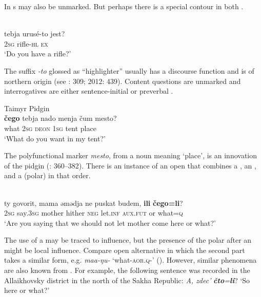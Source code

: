 In \textit{} s may also be unmarked. But perhaps there is a special  contour in both .

\ea%
    \label{ex:indo:25}
    \\
    \gll tebja  urusé-to  jest?\\
    2\textsc{sg}  rifle-\textsc{hl}  \textsc{ex}\\
    \glt ‘Do you have a rifle?’ \citep[312]{Stern2005}
    \z

\noindent The suffix \textit{-to} glossed as “highlighter” usually has a discourse function and is of northern  origin (see \citealt{Stern2005}: 309; 2012: 439). Content questions are unmarked and interrogatives are either sentence-initial or preverbal \citep[508]{Stern2012}.

\ea%
    \label{ex:indo:26}
    Taimyr Pidgin\\
    \gll \textbf{{čego}} tebja  nado  menja  čum  mesto?\\
    what  2\textsc{sg}  \textsc{deon}  1\textsc{sg}  tent  place\\
    \glt ‘What do you want in my tent?’ \citep[361]{Stern2012}
    \z

\noindent The polyfunctional  marker \textit{mesto}, from a noun meaning ‘place’, is an innovation of the pidgin (\citealt{Stern2012}: 360–382). There is an instance of an open  that combines a , an , and a (polar)  in that order.

\newpage 
\ea%
    \label{ex:indo:27}
    \\
    \gll ty  govorit,  mama  əmədja    ne  puskat  budem, \textbf{ili}  \textbf{čego=li}?\\
    2\textsc{sg}  say.3\textsc{sg} mother  hither    \textsc{neg}  let.\textsc{inf}  \textsc{aux.fut} or  what=\textsc{q}\\
    \glt ‘Are you saying that we should not let mother come here or what?’ \citep[310]{Stern2005}
    \z

\noindent The use of a  may be traced to  influence, but the presence of the  polar  after an  might be local influence. Compare  open alternative  in which the second part takes a similar form, e.g. \textit{maa-ŋu-} ‘what-\textsc{aor}.\textsc{q-}’ (). However, similar phenomena are also known from . For example, the following sentence was recorded in the Allaikhovsky district in the north of the Sakha Republic: \textit{A, zdec’} \textbf{\textit{čto}}\textit{=}\textbf{\textit{li}}? ‘So here or what?’ \citep{Krasovitsky2004}

